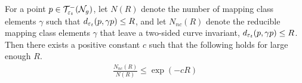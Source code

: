 


\begin{theorem}
  \label{thm:pure-exponential}
  For a point $p \in \mathcal{T}_{\varepsilon_t}^{-}(\mathcal{N}_g)$, let $N(R)$ denote the number of mapping class elements $\gamma$ such that $d_{\varepsilon_t}(p, \gamma p) \leq R$, and let $N_{nc}(R)$ denote the reducible mapping class elements $\gamma$ that leave a two-sided curve invariant, $d_{\varepsilon_t}(p, \gamma p) \leq R$.
  Then there exists a positive constant $c$ such that the following holds for large enough $R$.
  \begin{align*}
    \frac{N_{nc}(R)}{N(R)} \leq \exp(-cR)
  \end{align*}
\end{theorem}

